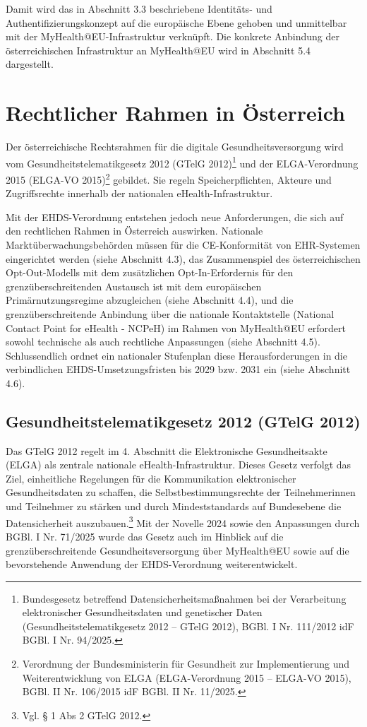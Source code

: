 Damit wird das in Abschnitt 3.3 beschriebene Identitäts- und Authentifizierungskonzept auf die europäische Ebene gehoben und unmittelbar mit der MyHealth@EU-Infrastruktur verknüpft. Die konkrete Anbindung der österreichischen Infrastruktur an MyHealth@EU wird in Abschnitt 5.4 dargestellt.


\chapter{Rechtlicher Rahmen in Österreich}
Der österreichische Rechtsrahmen für die digitale Gesundheitsversorgung wird vom Gesundheitstelematikgesetz 2012 (GTelG 2012)\footnote{Bundesgesetz betreffend Datensicherheitsmaßnahmen bei der Verarbeitung elektronischer
Gesundheitsdaten und genetischer Daten (Gesundheitstelematikgesetz 2012 – GTelG 2012), BGBl. I Nr. 111/2012 idF BGBl. I Nr. 94/2025.} und der ELGA-Verordnung 2015 (ELGA-VO 2015)\footnote{Verordnung der Bundesministerin für Gesundheit zur Implementierung und Weiterentwicklung von ELGA (ELGA-Verordnung 2015 – ELGA-VO 2015), BGBl. II Nr. 106/2015 idF BGBl. II Nr. 11/2025.} gebildet. Sie regeln Speicherpflichten, Akteure und Zugriffsrechte innerhalb der nationalen eHealth-Infrastruktur.

Mit der EHDS-Verordnung entstehen jedoch neue Anforderungen, die sich auf den rechtlichen Rahmen in Österreich auswirken. Nationale Marktüberwachungsbehörden müssen für die CE-Konformität von EHR-Systemen eingerichtet werden (siehe Abschnitt 4.3), das Zusammenspiel des österreichischen Opt-Out-Modells mit dem zusätzlichen Opt-In-Erfordernis für den grenzüberschreitenden Austausch ist mit dem europäischen Primärnutzungsregime abzugleichen (siehe Abschnitt 4.4), und die grenzüberschreitende Anbindung über die nationale Kontaktstelle (National Contact Point for eHealth - NCPeH) im Rahmen von MyHealth@EU erfordert sowohl technische als auch rechtliche Anpassungen (siehe Abschnitt 4.5). Schlussendlich ordnet ein nationaler Stufenplan diese Herausforderungen in die verbindlichen EHDS-Umsetzungsfristen bis 2029 bzw. 2031 ein (siehe Abschnitt 4.6).

\section{Gesundheitstelematikgesetz 2012 (GTelG 2012)}
 Das GTelG 2012 regelt im 4. Abschnitt die Elektronische Gesundheitsakte (ELGA) als zentrale nationale eHealth-Infrastruktur. Dieses Gesetz verfolgt das Ziel, einheitliche Regelungen für die Kommunikation elektronischer Gesundheitsdaten zu schaffen, die Selbstbestimmungsrechte der Teilnehmerinnen und Teilnehmer zu stärken und durch Mindeststandards auf Bundesebene die Datensicherheit auszubauen.\footnote{Vgl. § 1 Abs 2 GTelG 2012.} Mit der Novelle 2024 sowie den Anpassungen durch BGBl. I Nr. 71/2025 wurde das Gesetz auch im Hinblick auf die grenzüberschreitende Gesundheitsversorgung über MyHealth@EU sowie auf die bevorstehende Anwendung der EHDS-Verordnung weiterentwickelt.

